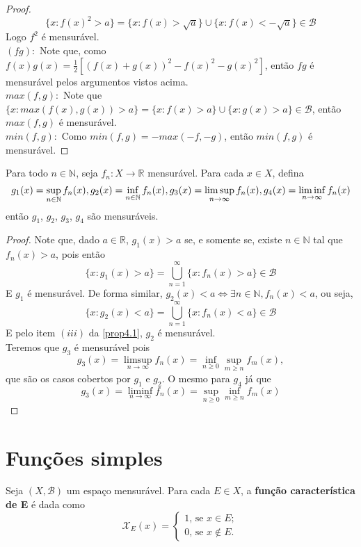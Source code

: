 \begin{proposicao}
\begin{proof}
        \[
        \{x:f(x)^2 > a\} = \{x:f(x)> \sqrt{a}\} \cup \{x:f(x) < - \sqrt{a}\} \in \mathcal{B}
        \] 
        Logo $f^2$ é mensurável. \\
        $(fg):$ Note que, como $f(x)g(x) = \frac{1}{2}[(f(x)+g(x))^2 - f(x)^2 - g(x)^2]$, então $fg$ é mensurável pelos argumentos vistos acima. \\
        $max(f,g):$ Note que $\{x : max(f(x),g(x))>a\} = \{x : f(x)> a\} \cup \{x : g(x) > a\} \in \mathcal{B}$, então $max(f,g)$ é mensurável. \\
        $min(f,g):$ Como $min(f,g) = -max(-f,-g)$, então $min(f,g)$ é mensurável.  
    \end{proof}
\end{proposicao}

\begin{proposicao}
    Para todo $n \in \mathbb{N}$, seja $f_n: X \to \mathbb{R}$ mensurável. Para cada $x \in X$, defina 
    \[
    g_1(x) = \sup _{n \in \mathbb{N}} f_n(x), \\ 
    g_2(x) = \inf _{n \in \mathbb{N}} f_n(x), \\
    g_3(x) = \limsup_{n \to \infty}  f_n(x), \\
    g_4(x) = \liminf_{n \to \infty} f_n(x)  
    \]
    então $g_1$, $g_2$, $g_3$, $g_4$ são mensuráveis.
    \begin{proof}
        Note que, dado $a \in \mathbb{R}$, $g_1(x) > a$ se, e somente se, existe $n \in \mathbb{N}$ tal que $f_n(x) > a$, pois então 
        \[
        \{x: g_1(x)>a\} = \bigcup _{n=1} ^\infty \{ x : f_n(x) >a \} \in \mathcal{B}     
        \]
        E $g_1$ é mensurável. De forma similar, $g_2(x) < a \iff \exists n \in \mathbb{N},f_n (x) < a$, ou seja, 
        \[
        \{x: g_2(x)<a\} = \bigcup _{n=1} ^\infty \{ x : f_n(x) <a \} \in \mathcal{B}     
        \]
        E pelo item $(iii)$ da \ref{prop4.1}, $g_2$ é mensurável. \\
        Teremos que $g_3$ é mensurável pois 
        \[
        g_3(x) = \limsup_{n \to \infty} f_n(x) = \inf_{n \geq 0} \sup_{m \geq n} f_m(x),   
        \]
        que são os casos cobertos por $g_1$ e $g_2$. O mesmo para $g_4$ já que
        \[
        g_3(x) = \liminf_{n \to \infty} f_n(x) = \sup_{n \geq 0} \inf_{m \geq n} f_m(x)   
        \] 
    \end{proof}
\end{proposicao}

\section{Funções simples}
\begin{definicao}
    Seja $(X,\mathcal{B})$ um espaço mensurável. Para cada $E \in X$, a \textbf{função característica de E} é dada como 
    \[
    \mathcal{X}_E (x) = 
    \begin{cases}
    1 \text{, se } x \in E; \\
    0 \text{, se } x \notin E.   
    \end{cases}    
    \]
\end{definicao}

